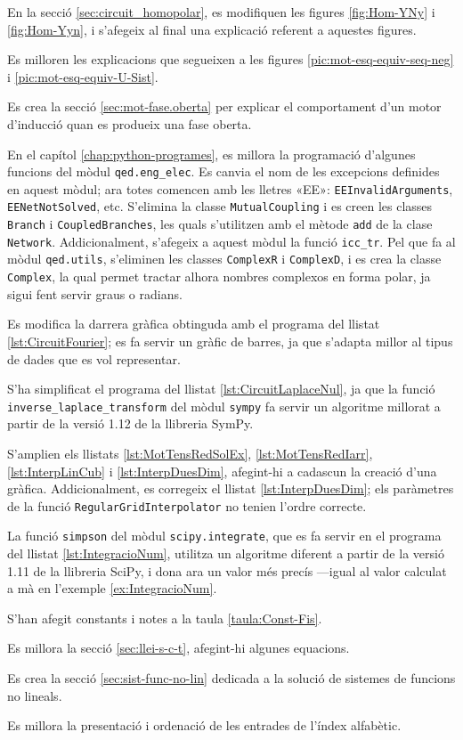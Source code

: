 En la secció \ref{sec:circuit_homopolar}, es modifiquen les figures \ref{fig:Hom-YNy} i  \ref{fig:Hom-Yyn}, i s'afegeix al final una explicació referent a aquestes figures.

Es  milloren les explicacions que segueixen a les figures \ref{pic:mot-esq-equiv-seq-neg} i  \ref{pic:mot-esq-equiv-U-Sist}.


Es crea la secció \ref{sec:mot-fase.oberta} per explicar el comportament d'un motor d'inducció quan es produeix una fase oberta.

En el capítol \ref{chap:python-programes}, es millora la programació d'algunes funcions del mòdul  \texttt{qed.eng\_elec}. Es canvia el nom de les excepcions definides en aquest mòdul; ara totes comencen amb les lletres «EE»: \texttt{EEInvalidArguments}, \texttt{EENetNotSolved}, etc. S'elimina la classe \texttt{MutualCoupling} i es creen les classes \texttt{Branch} i \texttt{CoupledBranches}, les quals s'utilitzen amb el mètode \texttt{add} de la clase \texttt{Network}. Addicionalment, s'afegeix a aquest mòdul la funció \texttt{icc\_tr}. Pel que fa al mòdul \texttt{qed.utils}, s'eliminen les classes \texttt{ComplexR} i \texttt{ComplexD}, i es crea la classe \texttt{Complex}, la qual permet tractar alhora nombres complexos en forma polar, ja sigui fent servir graus o radians.

Es modifica la darrera gràfica obtinguda amb el programa del llistat  \ref{lst:CircuitFourier}; es fa servir un gràfic de barres,  ja que  s'adapta millor al tipus de dades que es vol representar.

S'ha simplificat el programa del llistat \ref{lst:CircuitLaplaceNul}, ja que la funció
\texttt{inverse\_laplace\_transform} del mòdul \texttt{sympy} fa servir un algoritme millorat a partir de la versió 1.12 de la llibreria SymPy.


S'amplien els llistats \ref{lst:MotTensRedSolEx}, \ref{lst:MotTensRedIarr},  \ref{lst:InterpLinCub} i \ref{lst:InterpDuesDim}, afegint-hi a cadascun la creació d'una gràfica. Addicionalment, es corregeix el llistat \ref{lst:InterpDuesDim}; els paràmetres de la funció \texttt{RegularGridInterpolator} no tenien l'ordre correcte.


La funció \texttt{simpson} del mòdul \texttt{scipy.integrate}, que es fa servir en el programa del llistat \ref{lst:IntegracioNum}, utilitza un algoritme diferent  a partir  de la versió 1.11 de la llibreria SciPy, i dona  ara un valor més precís ---igual al valor calculat a mà en l'exemple \ref{ex:IntegracioNum}.


S'han afegit constants i  notes a la taula \ref{taula:Const-Fis}.

Es millora la secció \ref{sec:llei-s-c-t}, afegint-hi algunes equacions.

Es crea la secció \ref{sec:sist-func-no-lin} dedicada a la solució de sistemes de funcions  no lineals.

Es millora la presentació i ordenació de les entrades de l'índex alfabètic.